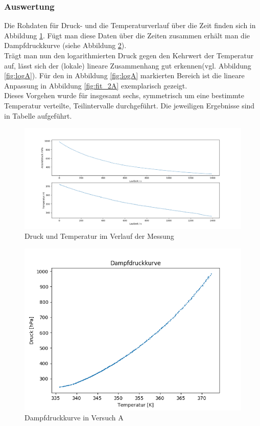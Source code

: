 \documentclass[12pt,a4paper]{article}
\begin{document}
\subsubsection{Auswertung}
Die Rohdaten für Druck- und die Temperaturverlauf über die Zeit finden sich in Abbildung \ref{fig:RohdatenA}. Fügt man diese Daten über die Zeiten zusammen erhält man die Dampfdruckkurve (siehe Abbildung \ref{fig:DampfA}).\\
Trägt man nun den logarithmierten Druck gegen den Kehrwert der Temperatur auf, lässt sich der (lokale) lineare Zusammenhang gut erkennen(vgl. Abbildung \ref{fig:logA}). Für den in Abbildung \ref{fig:logA} markierten Bereich ist die lineare Anpassung in Abbildung \ref{fig:fit_2A} exemplarisch gezeigt.\\
Dieses Vorgehen wurde für insgesamt sechs, symmetrisch um eine bestimmte Temperatur verteilte, Teilintervalle durchgeführt. Die jeweiligen Ergebnisse sind in Tabelle %
aufgeführt.


\begin{figure}
\includegraphics[width=\linewidth]{Bilder/Rohdaten_HauptmessungA.png}
\caption[Dichtigkeit vor Hauptversuch Apparatur A]{Druck und Temperatur im Verlauf der Messung}
\label{fig:RohdatenA}
\end{figure}

\begin{figure}
\includegraphics[width=\linewidth]{Bilder/DampfdruckkurveA.png}
\caption[Dampfdruckkurve A]{Dampfdruckkurve in Versuch A}
\label{fig:DampfA}
\end{figure}
\end{document}
